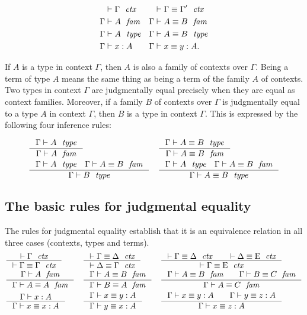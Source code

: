 \begin{align*}
\jctx*{\Gamma} & \jctxeq*{\Gamma}{\Gamma'}\\
\jfam*{\Gamma}{A} & \jfameq*{\Gamma}{A}{B}\\
\jtype*{\Gamma}{A} & \jtypeeq*{\Gamma}{A}{B}\\
\jterm*{\Gamma}{A}{x} & \jtermeq*{\Gamma}{A}{x}{y}.
\end{align*}

If $A$ is a type
in context $\Gamma$, then $A$ is also a family of contexts over $\Gamma$. Being
a term of type $A$ means the same thing as being a term of the family $A$ of contexts.
Two types in context $\Gamma$ are judgmentally equal precisely when they are equal
as context families. Moreover, if a family $B$ of contexts over $\Gamma$ is
judgmentally equal to a type $A$ in context $\Gamma$, then $B$ is a type in
context $\Gamma$. This is expressed by the following four inference rules:

\begin{align*}
& \inference{\jtype{\Gamma}{A}}{\jfam{\Gamma}{A}} & & \inference{\jtypeeq{\Gamma}{A}{B}}{\jfameq{\Gamma}{A}{B}}\\
& \inference{\jtype{\Gamma}{A}\quad\jfameq{\Gamma}{A}{B}}{\jtype{\Gamma}{B}}
& & \inference{\jtype{\Gamma}{A}\quad\jfameq{\Gamma}{A}{B}}{\jtypeeq{\Gamma}{A}{B}}
\end{align*}


\subsection{The basic rules for judgmental equality}
The rules for judgmental equality establish that it is an equivalence relation
in all three cases (contexts, types and terms).
\bgroup\small
\begin{align*}
& \inference{\jctx{\Gamma}}{\jctxeq{\Gamma}{\Gamma}} 
& & \inference{\jctxeq{\Gamma}{\Delta}}{\jctxeq{\Delta}{\Gamma}} 
& & \inference{\jctxeq{\Gamma}{\Delta}\qquad\jctxeq{\Delta}{\greek{E}}}{\jctxeq{\Gamma}{\greek{E}}}\\
& \inference{\jfam{\Gamma}{A}}{\jfameq{\Gamma}{A}{A}} 
& & \inference{\jfameq{\Gamma}{A}{B}}{\jfameq{\Gamma}{B}{A}}
& & \inference{\jfameq{\Gamma}{A}{B}\qquad\jfameq{\Gamma}{B}{C}}{\jfameq{\Gamma}{A}{C}}\\
& \inference{\jterm{\Gamma}{A}{x}}{\jtermeq{\Gamma}{A}{x}{x}}
& & \inference{\jtermeq{\Gamma}{A}{x}{y}}{\jtermeq{\Gamma}{A}{y}{x}}
& & \inference{\jtermeq{\Gamma}{A}{x}{y}\qquad\jtermeq{\Gamma}{A}{y}{z}}{\jtermeq{\Gamma}{A}{x}{z}}
\end{align*}
\egroup

